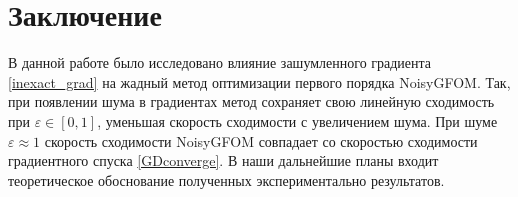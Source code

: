 \documentclass{article}
\begin{document}
\section{Заключение}
В данной работе было исследовано влияние зашумленного градиента \eqref{inexact_grad} на жадный метод оптимизации первого порядка NoisyGFOM. Так, при появлении шума в градиентах метод сохраняет свою линейную сходимость при $\varepsilon \in [0,1]$, уменьшая скорость сходимости с увеличением шума. При шуме $\varepsilon \approx 1$ скорость сходимости NoisyGFOM совпадает со скоростью сходимости градиентного спуска \eqref{GDconverge}.
В наши дальнейшие планы входит теоретическое обоснование полученных экспериментально результатов.



\begin{comment}
\section{Вычислительный эксперимент}
Для алгоритма ISTM в статье \cite{kornilov2023intermediate} была доказана следующая теорема.

\begin{theorem}\label{theo:coveregence_alg1}
Пусть функция $f$ -- выпуклая и $L$-гладкая с относительным шумом $\hat{\varepsilon} \in [0,1]$. Тогда после $N\geq 1$ итераций алгоритма  \texttt{ISTM} с промежуточным параметром $p \in [1,2]$ и 
\begin{equation}\label{formula_for_a}
    a = C \cdot \max{\{1, N^p \hat{\varepsilon}^2\}},\ C = 2304
\end{equation}
имеем невязку на $N$-ой итерации, равную 
\begin{equation}\label{conv_rate_alg1}
    f(y^N) - f(x^*) \leq \frac{8 a L R_0^2}{(N+1)^p},
\end{equation}
где $R_0 = \|x^0 - x^*\|_2$ 
или, если подставить параметр $a$ из \eqref{formula_for_a}, имеем
\begin{equation}\label{eq:conv_rate_alg1_proper_a}
f(y^N) - f(x^*) \leq 8C \cdot \max \left\{ \frac{LR_0^2}{N^p}, \hat{\varepsilon}^2 L R_0^2 \right\}.
\end{equation}
\end{theorem}

Теорема говорит о том, что при номерах итераций $N$ таких, что $N^p \hat{\varepsilon}^2 \le 1$, алгоритм сходится со скоростью $\sim \frac{1}{N^p}$. При больших номерах итераций, из-за наличия относительной погрешности в определении градиента, алгоритм выходит на вынужденное плато по невязке, равное $f(y^N) - f(x^*) = 8C \cdot \hat{\varepsilon}^2 L R_0^2$. Далее мы будем рассматривать случай $p = 2$ в силу его наиболее быстрой сходимости.


\end{comment}
\end{document}
